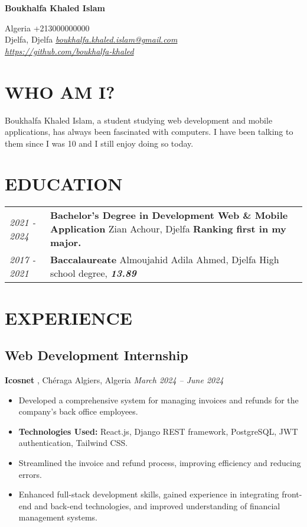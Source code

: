 \documentclass[a4paper,12pt]{article}
\begin{document}
\begin{center}
     \Huge{\textbf{Boukhalfa Khaled Islam}}
\end{center}

Algeria \hfill +213000000000\\
Djelfa, Djelfa \hfill \href{mailto:boukhalfa.khaled.islam@gmail.com}{\textit{ boukhalfa.khaled.islam@gmail.com }} \\ 
\href{https://github.com/boukhalfa-khaled}{\textit{ https://github.com/boukhalfa-khaled }}\\ 

\section{WHO AM I?}
Boukhalfa Khaled Islam, a student studying web development and mobile applications, has always been fascinated with computers. I have been talking to them since I was 10 and I still enjoy doing so today.

\section{EDUCATION}
\begin{tabular}{ l p{15in} }
    \textit{2021 - 2024} & \textbf{Bachelor's Degree in Development Web \& Mobile Application}
    \newline Zian Achour, Djelfa
    \newline \textbf{Ranking first in my major.} \\

    \textit{2017 - 2021 }& \textbf{Baccalaureate}
    \newline Almoujahid Adila Ahmed, Djelfa
    \newline High school degree, \textbf{\textit{13.89}} \\
\end{tabular}

\section{EXPERIENCE}
\subsection*{Web Development Internship} 
\textbf{Icosnet} , Chéraga Algiers, Algeria \hfil
\textit{March 2024 – June 2024}
\begin{itemize}
    \item Developed a comprehensive system for managing invoices and refunds for the company’s back office employees.
    \item \textbf{Technologies Used:} React.js, Django REST framework, PostgreSQL, JWT authentication, Tailwind CSS.
    \item Streamlined the invoice and refund process, improving efficiency and reducing errors.
    \item Enhanced full-stack development skills, gained experience in integrating front-end and back-end technologies, and improved understanding of financial management systems.
\end{itemize}
\end{document}

